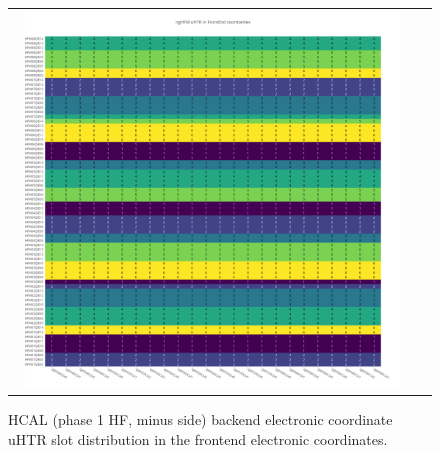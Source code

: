 \begin{figure}[htb]
 \begin{center}
  \begin{tabular}{cc}
   \includegraphics[angle=0,width=0.95\textwidth]{figures/appendix/ngHFM_uHTR_in_FrontEnd.png}
  \end{tabular}
  \caption{HCAL (phase 1 HF, minus side) backend electronic coordinate uHTR slot distribution in the frontend electronic coordinates.}
  \label{fig:lmapngHFMuHTRFEC}
 \end{center}
\end{figure}
\clearpage

